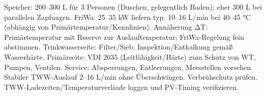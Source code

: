 \markdownRendererUlItem Speicher: 200–300 L für 3 Personen (Duschen, gelegentlich Baden); eher 300 L bei parallelen Zapfungen.\markdownRendererUlItemEnd 
\markdownRendererUlItem FriWa: 25–35 kW liefern typ. 10–16 L/min bei 40–45 °C (abhängig von Primärtemperatur/Kennlinien).\markdownRendererUlItemEnd 
\markdownRendererUlItem Annäherung ΔT: Primärtemperatur mit Reserve zur Auslauftemperatur; FriWa‑Regelung fein abstimmen.\markdownRendererUlItemEnd 
\markdownRendererUlEndTight \markdownRendererInterblockSeparator
{}
\markdownRendererSectionEnd \markdownRendererSectionBegin
{}\markdownRendererInterblockSeparator
{}\markdownRendererUlBeginTight
\markdownRendererUlItem Trinkwasserseite: Filter/Sieb; Inspektion/Entkalkung gemäß Wasserhärte.\markdownRendererUlItemEnd 
\markdownRendererUlItem Primärseite: VDI 2035 (Leitfähigkeit/Härte) zum Schutz von WT, Pumpen, Ventilen.\markdownRendererUlItemEnd 
\markdownRendererUlItem Service: Absperrungen, Entleerungen, Messstellen vorsehen.\markdownRendererUlItemEnd 
\markdownRendererUlEndTight \markdownRendererInterblockSeparator
{}
\markdownRendererSectionEnd \markdownRendererSectionBegin
{}\markdownRendererInterblockSeparator
{}\markdownRendererUlBeginTight
\markdownRendererUlItem Stabiler TWW‑Auslauf 2–16 L/min ohne Überschwingen.\markdownRendererUlItemEnd 
\markdownRendererUlItem Verbrühschutz prüfen.\markdownRendererUlItemEnd 
\markdownRendererUlItem TWW‑Ladezeiten/Temperaturverläufe loggen und PV‑Timing verifizieren.\markdownRendererUlItemEnd 
\markdownRendererUlEndTight 
\markdownRendererSectionEnd 
\markdownRendererSectionEnd \markdownRendererDocumentEnd